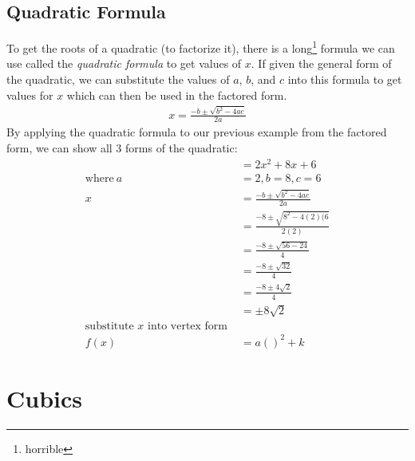 \subsection{Quadratic Formula}
To get the roots of a quadratic (to factorize it), there is a
long\footnote{horrible} formula we can use called the \emph{quadratic formula}
to get values of $x$. If given the general form of the quadratic, we can
substitute the values of $a$, $b$, and $c$ into this formula to get values for
$x$ which can then be used in the factored form.
\begin{align}
  x = \frac{-b \pm \sqrt{b^2 - 4ac}}{2a}
\end{align}
By applying the quadratic formula to our previous example from the factored
form, we can show all 3 forms of the quadratic:
\begin{align}
  & = 2x^2 + 8x + 6 \nonumber \\
  \text{where}~ a & = 2, b = 8, c = 6 \nonumber \\
  x & = \frac{-b \pm \sqrt{b^2 - 4ac}}{2a} \\
    & = \frac{-8 \pm \sqrt{8^2 - 4(2)(6}}{2(2)} \\
    & = \frac{-8 \pm \sqrt{56 - 24}}{4} \\
    & = \frac{-8 \pm \sqrt{32}}{4} \\
    & = \frac{-8 \pm 4\sqrt{2}}{4} \\    
    & = \pm 8\sqrt{2} \\
    \text{substitute $x$ into vertex form } \\
    f(x) & = a()^2 + k
\end{align}

\section{Cubics}
\lipsum[1]